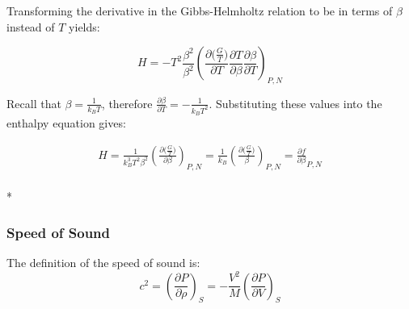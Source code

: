 \documentclass[aps,pre,nofootinbib,superscriptaddress,linenumbers,10pt, draft,tightenlines]{revtex4-1}
\begin{document}
\begin{itemize}
\begin{itemize}
    	Transforming the derivative in the Gibbs-Helmholtz relation to be in terms of $\beta$ instead of $T$ yields:
    	
    	\begin{equation}H=-T^2  \frac{\beta^2}{\beta^2}\left(\frac{\partial \big(\frac{G}{T}\big)}{\partial T} \frac{\partial T}{\partial \beta} \frac{\partial \beta}{\partial T}\right)_{P,N}\end{equation}
    	
    	
    	Recall that $\beta = \frac{1}{k_B T}$, therefore $\frac{\partial \beta}{\partial T} = - \frac{1}{k_B T^2}$. Substituting these values into the enthalpy equation gives:
    	
    	\begin{multline}
    	H = \frac{1}{k_B^3 T^2 \beta^2} \left(\frac{\partial \big(\frac{G}{T}\big)}{\partial \beta}\right)_{P,N}  = \frac{1}{k_B} \left(\frac{\partial \big(\frac{G}{T}\big)}{\beta}\right)_{P,N} = \frac{\partial f}{\partial \beta}_{P,N} 
    	\end{multline}\\*
    	
    	
    	
        \subsubsection{Speed of Sound}
        The definition of the speed of sound is\cite{sos}:
        \begin{equation}c^2 = \left(\frac{\partial P}{\partial \rho}\right)_{S} = -\frac{V^2}{M}\left(\frac{\partial P}{\partial V}\right)_{S}\end{equation}
        

\end{itemize}
\end{itemize}
\end{document}
